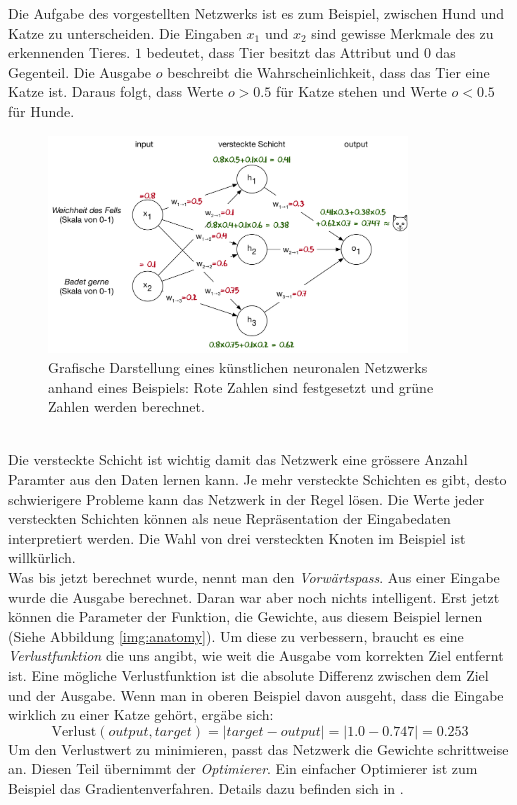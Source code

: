 Die Aufgabe des vorgestellten Netzwerks ist es zum Beispiel, zwischen Hund und Katze zu unterscheiden. Die Eingaben $x_1$ und $x_2$ sind gewisse Merkmale des zu erkennenden Tieres. $1$ bedeutet, dass Tier besitzt das Attribut und $0$ das Gegenteil. Die Ausgabe $o$ beschreibt die Wahrscheinlichkeit, dass das Tier eine Katze ist. Daraus folgt, dass Werte $o>0.5$ für Katze stehen und Werte $o<0.5$ für Hunde.
\begin{figure}[hbt]
	\centering
		\includegraphics[width=0.85\textwidth]{assets/neural_net.png}
	\caption{Grafische Darstellung eines künstlichen neuronalen Netzwerks anhand eines Beispiels: Rote Zahlen sind festgesetzt und grüne Zahlen werden berechnet.}
	\label{img:neuralnet}
\end{figure}
\\
Die versteckte Schicht ist wichtig damit das Netzwerk eine grössere Anzahl Paramter aus den Daten lernen kann. Je mehr versteckte Schichten es gibt, desto schwierigere Probleme kann das Netzwerk in der Regel lösen. Die Werte jeder versteckten Schichten können als neue Repräsentation der Eingabedaten interpretiert werden. Die Wahl von drei versteckten Knoten im Beispiel ist willkürlich.
\\
Was bis jetzt berechnet wurde, nennt man den \textit{Vorwärtspass}. Aus einer Eingabe wurde die Ausgabe berechnet. Daran war aber noch nichts intelligent. Erst jetzt können die Parameter der Funktion, die Gewichte, aus diesem Beispiel lernen (Siehe Abbildung \ref{img:anatomy}). Um diese zu verbessern, braucht es eine \textit{Verlustfunktion} die uns angibt, wie weit die Ausgabe vom korrekten Ziel entfernt ist. Eine mögliche Verlustfunktion ist die absolute Differenz zwischen dem Ziel und der Ausgabe. Wenn man in oberen Beispiel davon ausgeht, dass die Eingabe wirklich zu einer Katze gehört, ergäbe sich:
$$ \text{Verlust}(output, target) = |target-output| = |1.0-0.747| = 0.253$$
Um den Verlustwert zu minimieren, passt das Netzwerk die Gewichte schrittweise an. Diesen Teil übernimmt der  \textit{Optimierer}. Ein einfacher Optimierer ist zum Beispiel das Gradientenverfahren. Details dazu befinden sich in \parencite{gradient}.

